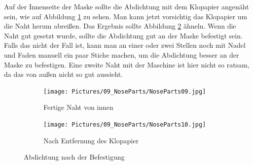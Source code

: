 \documentclass[12pt,parskip=full]{scrartcl}
\begin{document}
Auf der Innenseite der Maske sollte die Abdichtung mit dem Klopapier angenäht sein, wie auf Abbildung \ref{Nose09} zu sehen. Man kann jetzt vorsichtig das Klopapier um die Naht herum abreißen. Das Ergebnis sollte Abbildung \ref{Nose10} ähneln. Wenn die Naht gut gesetzt wurde, sollte die Abdichtung gut an der Maske befestigt sein. Falls das nicht der Fall ist, kann man an einer oder zwei Stellen noch mit Nadel und Faden manuell ein paar Stiche machen, um die Abdichtung besser an der Maske zu befestigen. Eine zweite Naht mit der Maschine ist hier nicht so ratsam, da das von außen nicht so gut aussieht. 

\begin{figure}[ht]
    \vspace{0.5cm}
    \centering
    \begin{subfigure}{0.48\textwidth}
        \centering
        \texttt{[image: Pictures/09\_NoseParts/NoseParts09.jpg]}
        \caption{Fertige Naht von innen}
        \label{Nose09}
    \end{subfigure}
    \begin{subfigure}{0.48\textwidth}
        \centering
        \texttt{[image: Pictures/09\_NoseParts/NoseParts10.jpg]}
        \caption{Nach Entfernung des Klopapier}
        \label{Nose10}
    \end{subfigure}
    \caption{Abdichtung nach der Befestigung}
    \label{NoseRes}
\end{figure}
\end{document}

